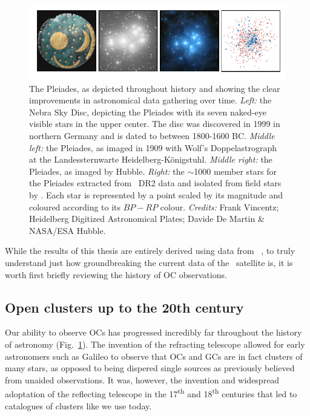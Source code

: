 \begin{figure}[tb]
	\includegraphics[width=\textwidth]{fig/c1/pleiades.pdf}
	\caption[The Pleiades as depicted throughout history]{The Pleiades, as depicted throughout history and showing the clear improvements in astronomical data gathering over time. \emph{Left:} the Nebra Sky Disc, depicting the Pleiades with its seven naked-eye visible stars in the upper center. The disc was discovered in 1999 in northern Germany and is dated to between 1800-1600 BC. \emph{Middle left:} the Pleiades, as imaged in 1909 with Wolf's Doppelastrograph at the Landessternwarte Heidelberg-Königstuhl. \emph{Middle right:} the Pleiades, as imaged by Hubble. \emph{Right:} the $\sim$1000 member stars for the Pleiades extracted from \gaia\ DR2 data and isolated from field stars by \cite{cantat-gaudin_characterising_2018}. Each star is represented by a point scaled by its magnitude and coloured according to its $BP-RP$ colour. \emph{Credits:} Frank Vincentz; Heidelberg Digitized Astronomical Plates; Davide De Martin \& NASA/ESA Hubble.}
	\label{fig:intro:history:pleiades}
\end{figure}

While the results of this thesis are entirely derived using data from \gaia\ , to truly understand just how groundbreaking the current data of the \gaia\ satellite is, it is worth first briefly reviewing the history of OC observations.


\subsection{Open clusters up to the 20th century}

Our ability to observe OCs has progressed incredibly far throughout the history of astronomy (Fig.~\ref{fig:intro:history:pleiades}). The invention of the refracting telescope allowed for early astronomers such as Galileo to observe that OCs and GCs are in fact clusters of many stars, as opposed to being dispered single sources as previously believed from unaided observations. It was, however, the invention and widespread adoptation of the reflecting telescope in the 17\textsuperscript{th} and 18\textsuperscript{th} centuries that led to catalogues of clusters like we use today.

